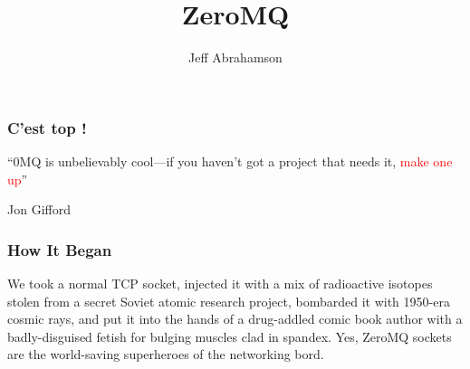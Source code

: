 \documentclass{beamer}
\title
{ZeroMQ}
\author[Abrahamson] {Jeff Abrahamson}\institute{Jellybooks}
\date[15 février 2016]
\newcommand\red[1]{\textcolor{red}{#1}}
\begin{document}
\begin{frame}
  \titlepage
\end{frame}

\begin{frame}
  \frametitle{C'est top !}

  ``0MQ is unbelievably cool---if you haven't got a project that needs it, \red{make one up}''

  Jon Gifford
\end{frame}

\begin{frame}
  \frametitle{How It Began}

  We took a normal TCP socket, injected it with a mix of radioactive
  isotopes stolen from a secret Soviet atomic research project,
  bombarded it with 1950-era cosmic rays, and put it into the hands of a
  drug-addled comic book author with a badly-disguised fetish for
  bulging muscles clad in spandex. Yes, ZeroMQ sockets are the
  world-saving superheroes of the networking bord.
\end{frame}
\end{document}

